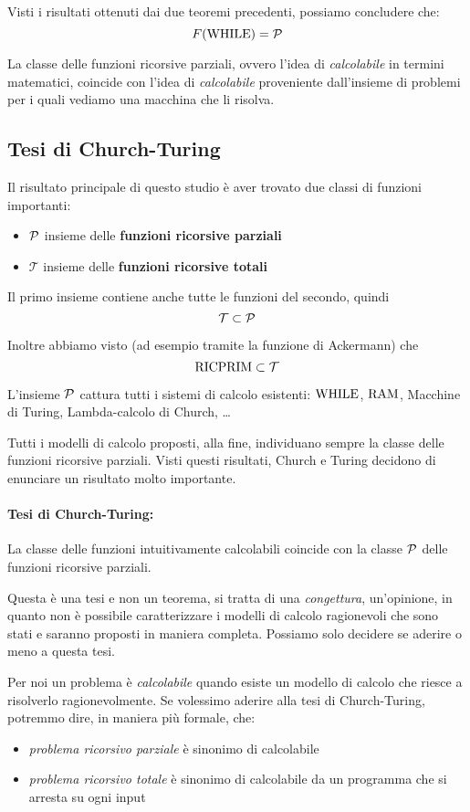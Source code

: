 Visti i risultati ottenuti dai due teoremi precedenti, possiamo concludere che: 
$$ F(\text{WHILE}) = \mathcal{P} $$

La classe delle funzioni ricorsive parziali, ovvero l'idea di \textit{calcolabile} in termini matematici, coincide con l'idea di \textit{calcolabile} proveniente dall'insieme di problemi per i quali vediamo una macchina che li risolva.

\subsection{Tesi di Church-Turing}

Il risultato principale di questo studio è aver trovato due classi di funzioni importanti: 
\begin{itemize}
	\item $\mathcal{P}$ insieme delle \textbf{funzioni ricorsive parziali}

	\item $\mathcal{T}$ insieme delle \textbf{funzioni ricorsive totali}
\end{itemize}

Il primo insieme contiene anche tutte le funzioni del secondo, quindi
$$ \mathcal{T} \subset \mathcal{P} $$

Inoltre abbiamo visto (ad esempio tramite la funzione di Ackermann) che
$$ \text{RICPRIM} \subset \mathcal{T} $$

L'insieme $\mathcal{P}$ cattura tutti i sistemi di calcolo esistenti: $\text{WHILE}$, $\text{RAM}$, Macchine di Turing, Lambda-calcolo di Church, \dots

Tutti i modelli di calcolo proposti, alla fine, individuano sempre la classe delle funzioni ricorsive parziali. Visti questi risultati, Church e Turing decidono di enunciare un risultato molto importante.

\paragraph{Tesi di Church-Turing:} La classe delle funzioni intuitivamente calcolabili coincide con la classe $\mathcal{P}$ delle funzioni ricorsive parziali.

Questa è una tesi e non un teorema, si tratta di una \textit{congettura}, un'opinione, in quanto non è possibile caratterizzare i modelli di calcolo ragionevoli che sono stati e saranno proposti in maniera completa. Possiamo solo decidere se aderire o meno a questa tesi.

Per noi un problema è \textit{calcolabile} quando esiste un modello di calcolo che riesce a risolverlo ragionevolmente. Se volessimo aderire alla tesi di Church-Turing, potremmo dire, in maniera più formale, che:
\begin{itemize}
	\item \textit{problema ricorsivo parziale} è sinonimo di calcolabile
    
	\item \textit{problema ricorsivo totale} è sinonimo di calcolabile da un programma che si arresta su ogni input
\end{itemize}

